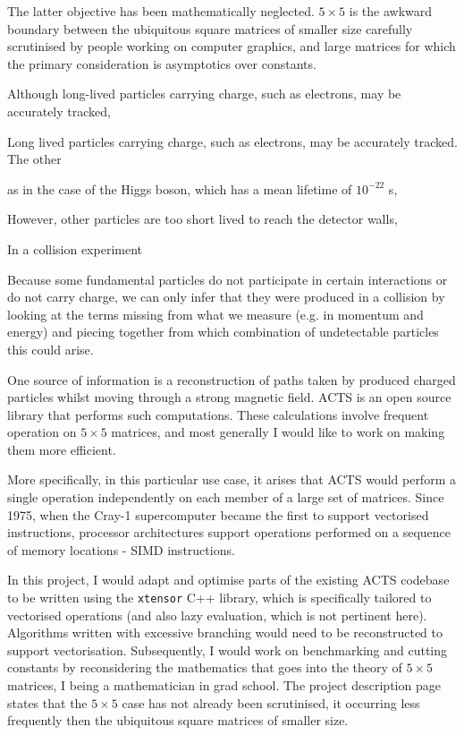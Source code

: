\documentclass[12pt]{amsart}
\begin{document}
The latter objective has been mathematically neglected. $5 \times 5$ is the awkward boundary between the ubiquitous square matrices of smaller size carefully scrutinised by people working on computer graphics, and large matrices for which the primary consideration is asymptotics over constants.

\iffalse
\clearpage

Although long-lived particles carrying charge, such as electrons, may be accurately tracked,

Long lived particles carrying charge, such as electrons, may be accurately tracked.
The other 

as in the case of the Higgs boson, which has a mean lifetime of $10^{-22}$ s, 

However, other particles are too short lived to reach the detector walls,

In a collision experiment

Because some fundamental particles do not participate in certain interactions or do not carry charge, we can only infer that they were produced in a collision by looking at the terms missing from what we measure (e.g. in momentum and energy) and piecing together from which combination of undetectable particles this could arise.

One source of information is a reconstruction of paths taken by produced charged particles whilst moving through a strong magnetic field. ACTS is an open source library that performs such computations. These calculations involve frequent operation on $5 \times 5$ matrices, and most generally I would like to work on making them more efficient.

More specifically, in this particular use case, it arises that ACTS would perform a single operation independently on each member of a large set of matrices. Since 1975, when the Cray-1 supercomputer became the first to support vectorised instructions, processor architectures support operations performed on a sequence of memory locations - SIMD instructions.

In this project, I would adapt and optimise parts of the existing ACTS codebase to be written using the \texttt{xtensor} C++ library, which is specifically tailored to vectorised operations (and also lazy evaluation, which is not pertinent here). Algorithms written with excessive branching would need to be reconstructed to support vectorisation. Subsequently, I would work on benchmarking and cutting constants by reconsidering the mathematics that goes into the theory of $5 \times 5$ matrices, I being a mathematician in grad school. The project description page states that the $5 \times 5$ case has not already been scrutinised, it occurring less frequently then the ubiquitous square matrices of smaller size.
\end{document}
